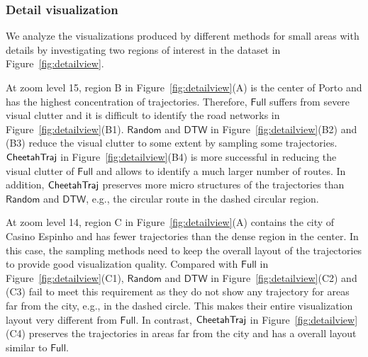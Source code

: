 \subsubsection{Detail visualization}\label{sec:detail}




We analyze the visualizations produced by different methods for small areas with details by investigating two regions of interest in the \pt{} dataset in Figure~\ref{fig:detailview}.



 At zoom level 15, region B in Figure~\ref{fig:detailview}(A) is the center of Porto and has the highest concentration of trajectories. Therefore, $\mathsf{Full}$ suffers from severe visual clutter and it is difficult to identify the road networks in Figure~\ref{fig:detailview}(B1).  $\mathsf{Random}$ and $\mathsf{DTW}$ in Figure~\ref{fig:detailview}(B2) and (B3) reduce the visual clutter to some extent by sampling some trajectories. $\mathsf{CheetahTraj}$ in Figure~\ref{fig:detailview}(B4) is more successful in reducing the visual clutter of $\mathsf{Full}$ and allows to identify a much larger number of routes. In addition, $\mathsf{CheetahTraj}$ preserves more micro structures of the trajectories than $\mathsf{Random}$ and $\mathsf{DTW}$, e.g., the circular route in the dashed circular region.



At zoom level 14, region C in Figure~\ref{fig:detailview}(A) contains the city of Casino Espinho and has fewer trajectories than the dense region in the center. In this case, the sampling methods need to keep the overall layout of the trajectories  to provide good visualization quality. Compared with $\mathsf{Full}$ in Figure~\ref{fig:detailview}(C1), $\mathsf{Random}$ and $\mathsf{DTW}$ in Figure~\ref{fig:detailview}(C2) and (C3) fail to meet this requirement as they do not show any trajectory for areas far from the city, e.g., in the dashed circle. This makes their entire visualization layout very different from $\mathsf{Full}$. In contrast, $\mathsf{CheetahTraj}$ in Figure~\ref{fig:detailview}(C4) preserves the trajectories in areas far from the city and has a overall layout similar to $\mathsf{Full}$.

